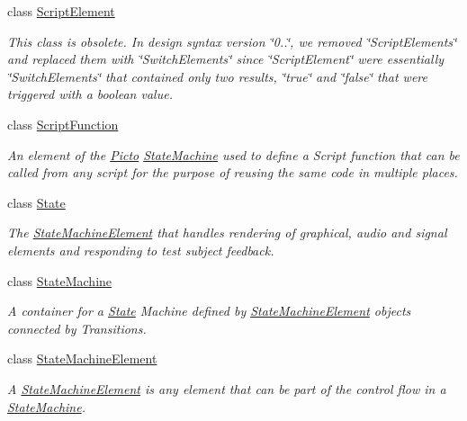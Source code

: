 \begin{DoxyCompactItemize}
class \hyperlink{class_picto_1_1_script_element}{Script\-Element}
\begin{DoxyCompactList}\small\item\em This class is obsolete. In design syntax version \char`\"{}0..\char`\"{}, we removed \char`\"{}\-Script\-Elements\char`\"{} and replaced them with \char`\"{}\-Switch\-Elements\char`\"{} since \char`\"{}\-Script\-Element\char`\"{} were essentially \char`\"{}\-Switch\-Elements\char`\"{} that contained only two results, \char`\"{}true\char`\"{} and \char`\"{}false\char`\"{} that were triggered with a boolean value. \end{DoxyCompactList}\item 
class \hyperlink{class_picto_1_1_script_function}{Script\-Function}
\begin{DoxyCompactList}\small\item\em An element of the \hyperlink{namespace_picto}{Picto} \hyperlink{class_picto_1_1_state_machine}{State\-Machine} used to define a Script function that can be called from any script for the purpose of reusing the same code in multiple places. \end{DoxyCompactList}\item 
class \hyperlink{class_picto_1_1_state}{State}
\begin{DoxyCompactList}\small\item\em The \hyperlink{class_picto_1_1_state_machine_element}{State\-Machine\-Element} that handles rendering of graphical, audio and signal elements and responding to test subject feedback. \end{DoxyCompactList}\item 
class \hyperlink{class_picto_1_1_state_machine}{State\-Machine}
\begin{DoxyCompactList}\small\item\em A container for a \hyperlink{class_picto_1_1_state}{State} Machine defined by \hyperlink{class_picto_1_1_state_machine_element}{State\-Machine\-Element} objects connected by Transitions. \end{DoxyCompactList}\item 
class \hyperlink{class_picto_1_1_state_machine_element}{State\-Machine\-Element}
\begin{DoxyCompactList}\small\item\em A \hyperlink{class_picto_1_1_state_machine_element}{State\-Machine\-Element} is any element that can be part of the control flow in a \hyperlink{class_picto_1_1_state_machine}{State\-Machine}. \end{DoxyCompactList}\item 

\end{DoxyCompactItemize}
